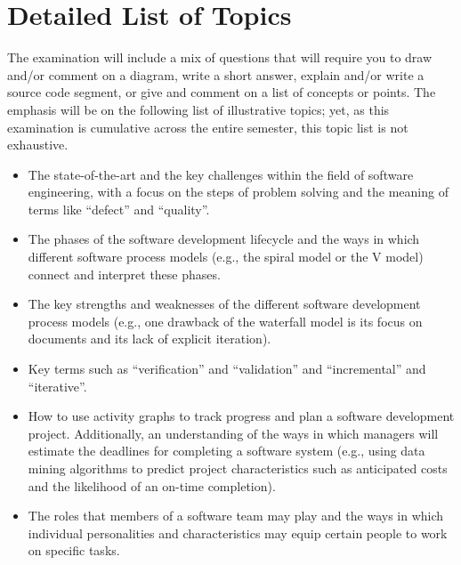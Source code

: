 \vspace*{-.25in}
\section*{Detailed List of Topics}
\vspace*{-.05in}

\noindent The examination will include a mix of questions that will require you to draw and/or comment on a diagram,
write a short answer, explain and/or write a source code segment, or give and comment on a list of concepts or points.
The emphasis will be on the following list of illustrative topics; yet, as this examination is cumulative across the
entire semester, this topic list is not exhaustive.

\vspace*{-.05in}
\begin{itemize}

  \itemsep 0in

  \item The state-of-the-art and the key challenges within the field of software engineering, with a focus on the steps
    of problem solving and the meaning of terms like ``defect'' and ``quality''.

  \item The phases of the software development lifecycle and the ways in which different software process models (e.g.,
    the spiral model or the V model) connect and interpret these phases.

  \item The key strengths and weaknesses of the different software development process models (e.g., one drawback of
    the waterfall model is its focus on documents and its lack of explicit iteration).

  \item Key terms such as ``verification'' and ``validation'' and ``incremental'' and ``iterative''.

  \item How to use activity graphs to track progress and plan a software development project. Additionally, an
    understanding of the ways in which managers will estimate the deadlines for completing a software system (e.g.,
    using data mining algorithms to predict project characteristics such as anticipated costs and the likelihood of an
    on-time completion).

  \item The roles that members of a software team may play and the ways in which individual personalities
    and characteristics may equip certain people to work on specific tasks.


\end{itemize}
